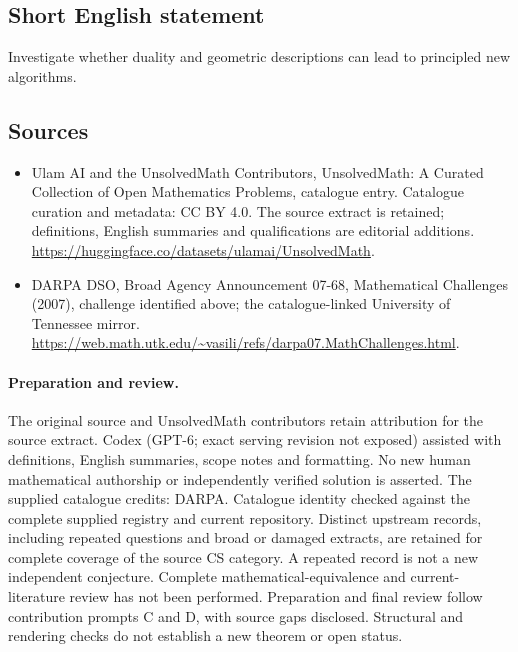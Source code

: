 \documentclass[11pt]{article}
\begin{document}
\subsection{Short English statement}
Investigate whether duality and geometric descriptions can lead to principled new algorithms.
\subsection{Sources}
\begin{itemize}
\item[\hypertarget{source:statement:1}{S1}] Ulam AI and the UnsolvedMath Contributors, UnsolvedMath: A Curated Collection of Open Mathematics Problems, catalogue entry. Catalogue curation and metadata: CC BY 4.0. The source extract is retained; definitions, English summaries and qualifications are editorial additions.
\url{https://huggingface.co/datasets/ulamai/UnsolvedMath}.
\item[\hypertarget{source:statement:2}{S2}] DARPA DSO, Broad Agency Announcement 07-68, Mathematical Challenges (2007), challenge identified above; the catalogue-linked University of Tennessee mirror.
\url{https://web.math.utk.edu/~vasili/refs/darpa07.MathChallenges.html}.
\end{itemize}
\paragraph{Preparation and review.}
The original source and UnsolvedMath contributors retain attribution for the source extract. Codex (GPT-6; exact serving revision not exposed) assisted with definitions, English summaries, scope notes and formatting. No new human mathematical authorship or independently verified solution is asserted. The supplied catalogue credits: DARPA. Catalogue identity checked against the complete supplied registry and current repository. Distinct upstream records, including repeated questions and broad or damaged extracts, are retained for complete coverage of the source CS category. A repeated record is not a new independent conjecture. Complete mathematical-equivalence and current-literature review has not been performed. Preparation and final review follow contribution prompts C and D, with source gaps disclosed. Structural and rendering checks do not establish a new theorem or open status.
\label{end:statement}
\end{document}
